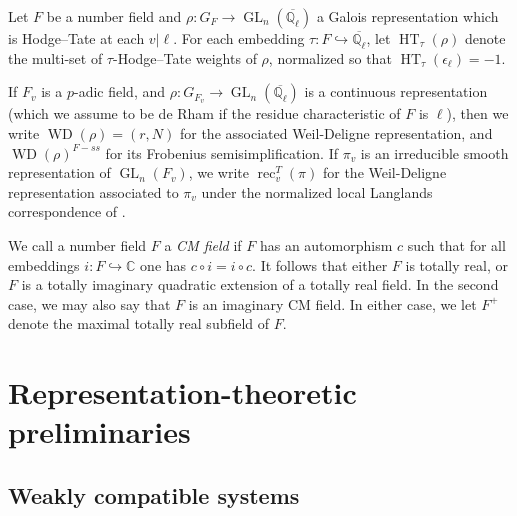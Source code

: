 \documentclass{amsart}
\theoremstyle{definition}
\numberwithin{equation}{section} %
\newcommand{\GL}{\operatorname{GL}}
\newcommand{\WD}{\operatorname{WD}}
\newcommand{\rec}{\operatorname{rec}}
\newcommand{\Qlbar}{\ensuremath{\overline{\mathbb{Q}_\ell}}}
\newcommand{\HT}{\operatorname{HT}}
\newcommand{\bb}[1]{\mathbb{#1}}
\begin{document}
Let $F$ be a number field and $\rho: G_F \to \GL_n(\Qlbar)$ a Galois representation which is Hodge--Tate at each $v|\ell$.
For each embedding $\tau: F \hookrightarrow \Qlbar$, let $\HT_\tau(\rho)$ denote the multi-set of $\tau$-Hodge--Tate weights of $\rho$, normalized so that $\HT_\tau(\epsilon_\ell) = -1$.

If \( F_v \) is a \( p \)-adic field, and \( \rho:G_{F_v}\to\GL_n(\Qlbar) \) is a continuous representation (which we assume to be de Rham if the residue characteristic of \( F \) is \(\ell\)), then we write \( \WD(\rho)=(r,N) \) for the associated Weil-Deligne representation, and \( \WD(\rho)^{F-ss} \) for its Frobenius semisimplification. If \( \pi_v \) is an irreducible smooth representation of $\GL_n(F_v)$, we write $\rec_v^T(\pi)$ for the Weil-Deligne representation associated to \( \pi_v \) under the normalized local Langlands correspondence of \cite{harristaylorLLC}.

We call a number field \( F \) a \emph{CM field} if $F$ has an automorphism \( c \) such that for all embeddings \( i:F\hookrightarrow\bb{C} \) one has \( c\circ i = i \circ c \). It follows that either \( F \) is totally real, or \( F \) is a totally imaginary quadratic extension of a totally real field. In the second case, we may also say that \( F \) is an imaginary CM field. In either case, we let \( F^+ \) denote the maximal totally real subfield of \( F \).

\section{Representation-theoretic preliminaries}

\subsection{Weakly compatible systems}
\end{document}
